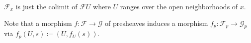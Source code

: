 $\mathcal{F}_x$ is just the colimit of $\mathcal{F}U$ where $U$ ranges over the
open neighborhoods of $x$.

Note that a morphism $f\colon \mathcal{F}\to \mathcal{G}$ of presheaves induces a morphism
$f_p\colon \mathcal{F}_p\to \mathcal{G}_p$ via $f_p(U, s)\coloneqq (U, f_U(s))$.
